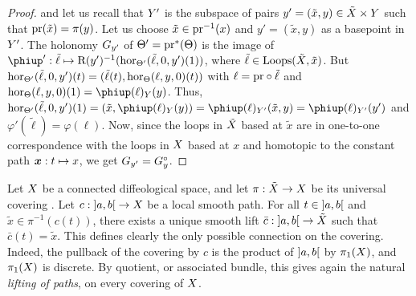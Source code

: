 \begin{proof}
  and let us recall that $Y'$ is the subspace of pairs $y' = (\tilde x, y) \in \tilde{X} \times Y$ such that $\mathrm{pr}(\tilde x) = \pi(y)$.
  Let us choose $\tilde x \in \mathrm{pr}^{-1}(x)$ and $y' = (\tilde x, y)$ as a basepoint in $Y'$.
  The holonomy $G_{y'}$ of $\Theta' = \mathrm{pr}^*(\Theta)$ is the image of $\varphi' : \tilde\ell \mapsto \orb{y'}^{-1}(\hor_{\Theta'}(\tilde\ell,0,y')(1))$,
  where $\tilde \ell \in \operatorname{Loops}(\tilde {X},\tilde x)$.
  But $\operatorname{hor}_{\Theta'}(\tilde\ell,0,y')(t) = (\tilde\ell(t), \operatorname{hor}_\Theta(\ell,y,0)(t))$ with $\ell = \mathrm{pr} \circ \tilde \ell$ and $\hor_\Theta(\ell,y,0)(1) = \varphi(\ell)_\Y(y)$.
  Thus,
  $\hor_{\Theta'}(\tilde\ell,0,y')(1) = (\tilde x, \varphi(\ell)_\Y(y)) = \varphi(\ell)_{\Y'}(\tilde x,y) = \varphi(\ell)_{\Y'}(y')$ and $\varphi'(\tilde \ell) = \varphi(\ell)$.
  Now,
  since the loops in $\tilde {X}$ based at $\tilde x$ are in one-to-one correspondence with the loops in $X$ based at $x$ and homotopic to the constant path ${\boldsymbol x} : t \mapsto x$,
  we get $G_{y'} = G_y^\circ$.
\end{proof}

\begin{article}
  \label{The-natural-connection-on-a-covering}
  Let $X$ be a connected diffeological space,
  and let $\pi : \tilde {X} \to X$
  be its universal covering .
  Let $c : \left] a,b \right[ \to X$ be a local smooth path.
  For all $t \in \left] a,b \right[$ and $\tilde x \in \pi^{-1}(c(t))$,
  there exists a unique smooth lift $\bar c : \left] a,b \right[ \to \tilde {X}$ such that $\bar c(t) = \tilde x$.
  This defines clearly the only possible connection on the covering.
  Indeed,
  the pullback of the covering by $c$ is the product of $\left] a,b \right[$ by $\pi_1(X)$,
  and $\pi_1(X)$ is discrete.
  By quotient,
  or associated bundle,
  this gives again the natural {\em lifting of paths}, on every covering of $X$.
\end{article} %


